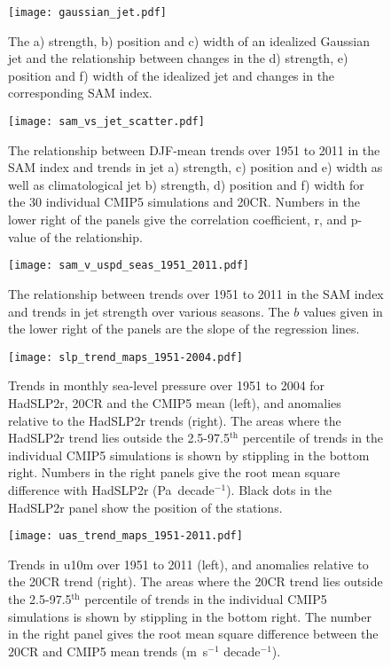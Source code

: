 \documentclass{ametsoc}
\begin{document}
\begin{figure}[t]
  \noindent\texttt{[image: gaussian\_jet.pdf]}\\
  \caption{The a) strength, b) position and c) width of an idealized Gaussian jet and the relationship 
  between changes in the d) strength, e) position and f) width of the idealized jet and changes in the 
  corresponding SAM index.}\label{fig:gaussian_jet}
\end{figure}

\begin{figure}[t]
  \noindent\texttt{[image: sam\_vs\_jet\_scatter.pdf]}\\
  \caption{The relationship between DJF-mean trends over 1951 to 2011 in the SAM index and 
   trends in jet a) strength, c) position
   and e) width as well as climatological jet b) strength, d) position and f) width for the 30
    individual CMIP5 simulations and 20CR. Numbers in the lower right of the panels give the correlation 
    coefficient, r, and p-value of the relationship.}\label{fig:sam_vs_jet_scatter}
\end{figure}

\begin{figure}[t]
  \noindent\texttt{[image: sam\_v\_uspd\_seas\_1951\_2011.pdf]}\\
  \caption{The relationship between trends over 1951 to 2011 in the SAM index and 
   trends in jet strength over various seasons. The $b$ values given in the lower right
   of the panels are the slope of the regression lines.}\label{fig:sam_vs_jet_seas}
\end{figure}

\begin{figure}[t]
  \noindent\texttt{[image: slp\_trend\_maps\_1951-2004.pdf]}\\
  \caption{Trends in monthly sea-level pressure over 1951 to 2004 for HadSLP2r, 20CR and the CMIP5 mean (left),
   and anomalies relative to the HadSLP2r trends (right). The areas where the HadSLP2r trend lies 
   outside the 2.5-97.5$^\textrm{th}$ percentile of trends in the individual CMIP5 simulations is shown 
   by stippling in the bottom right. Numbers in the right panels give the root mean square difference 
   with HadSLP2r (Pa~decade$^{-1}$). Black dots in the HadSLP2r panel show the position of the
    \cite{Marshall_2003} stations.} \label{fig:slp_trend_maps_1951-2004}
\end{figure}

\begin{figure}[t]
  \noindent\texttt{[image: uas\_trend\_maps\_1951-2011.pdf]}\\
  \caption{Trends in u10m over 1951 to 2011 (left), and anomalies relative to the 20CR trend (right). 
  The areas where the 20CR trend lies outside the 2.5-97.5$^\textrm{th}$ percentile of trends in the individual
   CMIP5 simulations is shown by stippling in the bottom right. The number in the right panel gives the 
   root mean square difference between the 20CR and CMIP5 mean trends (m~s$^{-1}$ decade$^{-1}$).}\label{fig:uas_trend_maps_1951-2011}
\end{figure}
\end{document}
